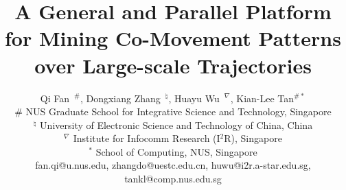 \documentclass{vldb}
\begin{document}

\title{A General and Parallel Platform for Mining Co-Movement Patterns over Large-scale Trajectories}


%
%
%
%
%

\author{
	\vspace{1mm}
	Qi Fan~$^\#$,
	Dongxiang Zhang~$^\natural$,
	Huayu Wu~$^\nabla$,
	Kian-Lee Tan$^{\#*}$ \\
	{\fontsize{10}{10}\selectfont $\#$ NUS Graduate School for Integrative Science and Technology, Singapore}\\
	{\fontsize{10}{10}\selectfont $^\natural$ University of Electronic Science and Technology of China, China}\\
	{\fontsize{10}{10}\selectfont $^\nabla$  Institute for Infocomm Research (I$^2$R), Singapore}\\
	{\fontsize{10}{10}\selectfont $^*$ School of Computing, NUS, Singapore}\\
	{\fontsize{10}{10}\selectfont%
	 fan.qi@u.nus.edu, zhangdo@uestc.edu.cn, huwu@i2r.a-star.edu.sg, tankl@comp.nus.edu.sg}
}

\maketitle
\end{document}
